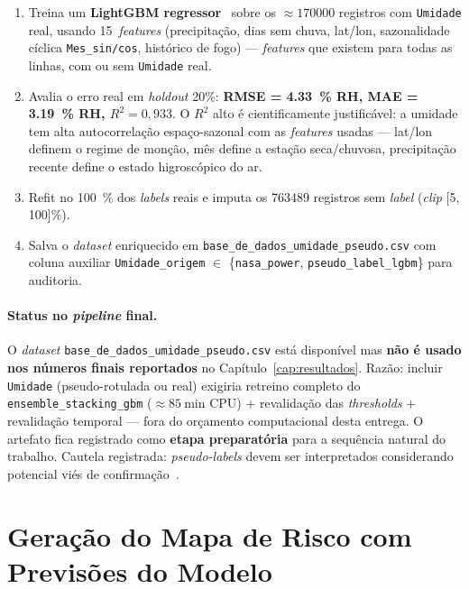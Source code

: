 \begin{enumerate}
  \item Treina um \textbf{LightGBM regressor}~\cite{ke2017lightgbm} sobre os \(\approx \num{170000}\) registros com \texttt{Umidade} real, usando 15~\emph{features} (precipitação, dias sem chuva, lat/lon, sazonalidade cíclica \texttt{Mes\_sin/cos}, histórico de fogo) --- \emph{features} que existem para todas as linhas, com ou sem \texttt{Umidade} real.

  \item Avalia o erro real em \emph{holdout} 20\%: \textbf{RMSE = \SI{4,33}{\percent} RH, MAE = \SI{3,19}{\percent} RH, \(R^2 = 0{,}933\)}. O \(R^2\) alto é cientificamente justificável: a umidade tem alta autocorrelação espaço-sazonal com as \emph{features} usadas --- lat/lon definem o regime de monção, mês define a estação seca/chuvosa, precipitação recente define o estado higroscópico do ar.

  \item Refit no \SI{100}{\percent} dos \emph{labels} reais e imputa os \num{763489} registros sem \emph{label} (\emph{clip} [5, 100]\%).

  \item Salva o \emph{dataset} enriquecido em \texttt{base\_de\_dados\_umidade\_pseudo.csv} com coluna auxiliar \texttt{Umidade\_origem} \(\in\) \{\texttt{nasa\_power}, \texttt{pseudo\_label\_lgbm}\} para auditoria.
\end{enumerate}

\paragraph{Status no \emph{pipeline} final.} O \emph{dataset} \texttt{base\_de\_dados\_umidade\_pseudo.csv} está disponível mas \textbf{não é usado nos números finais reportados} no Capítulo~\ref{cap:resultados}. Razão: incluir \texttt{Umidade} (pseudo-rotulada ou real) exigiria retreino completo do \texttt{ensemble\_stacking\_gbm} (\(\approx \SI{85}{\minute}\) CPU) + revalidação das \emph{thresholds} + revalidação temporal --- fora do orçamento computacional desta entrega. O artefato fica registrado como \textbf{etapa preparatória} para a sequência natural do trabalho. Cautela registrada: \emph{pseudo-labels} devem ser interpretados considerando potencial viés de confirmação~\cite{arazo2020pseudo}.

\section{Geração do Mapa de Risco com Previsões do Modelo}

